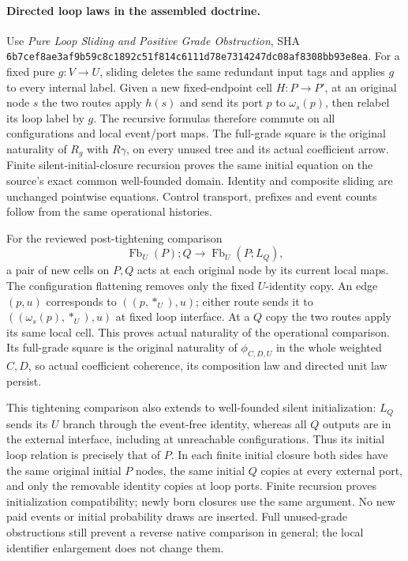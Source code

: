 \documentclass[11pt]{article}
\begin{document}
\paragraph{Directed loop laws in the assembled doctrine.}
Use \emph{Pure Loop Sliding and Positive Grade Obstruction}, SHA
\texttt{6b7cef8ae3af9b59c8c1892c51f814c6111d78e7314247dc08af8308bb93e8ea}.
For a fixed pure $g:V\to U$, sliding deletes the same redundant input tags
and applies $g$ to every internal label. Given a new fixed-endpoint cell
$H:P\to P'$, at an original node $s$ the two routes apply $h(s)$ and
send its port $p$ to $\omega_s(p)$, then relabel its loop label by $g$.
The recursive formulas therefore commute on all configurations and local
event/port maps. The full-grade square is the original naturality of
$R_g$ with $R\gamma$, on every unused tree and its actual coefficient
arrow. Finite silent-initial-closure recursion proves the same initial
equation on the source's exact common well-founded domain. Identity and
composite sliding are unchanged pointwise equations. Control transport,
prefixes and event counts follow from the same operational histories.

For the reviewed post-tightening comparison
\[
 \operatorname{Fb}_U(P);Q\longrightarrow
 \operatorname{Fb}_U(P;L_Q),
\]
a pair of new cells on $P,Q$ acts at each original node by its current
local maps. The configuration flattening removes only the fixed
$U$-identity copy. An edge $(p,u)$ corresponds to
$((p,*_U),u)$; either route sends it to
$((\omega_s(p),*_U),u)$ at fixed loop interface. At a $Q$ copy the two
routes apply its same local cell. This proves actual naturality of the
operational comparison. Its full-grade square is the original naturality
of $\phi_{C,D,U}$ in the whole weighted $C,D$, so actual coefficient
coherence, its composition law and directed unit law persist.

This tightening comparison also extends to well-founded silent
initialization: $L_Q$ sends its $U$ branch through the event-free identity,
whereas all $Q$ outputs are in the external interface, including at
unreachable configurations. Thus its initial loop relation is precisely
that of $P$. In each finite initial closure both sides have the same
original initial $P$ nodes, the same initial $Q$ copies at every external
port, and only the removable identity copies at loop ports. Finite
recursion proves initialization compatibility; newly born closures use
the same argument. No new paid events or initial probability draws are
inserted. Full unused-grade obstructions still prevent a reverse native
comparison in general; the local identifier enlargement does not change
them.
\end{document}
